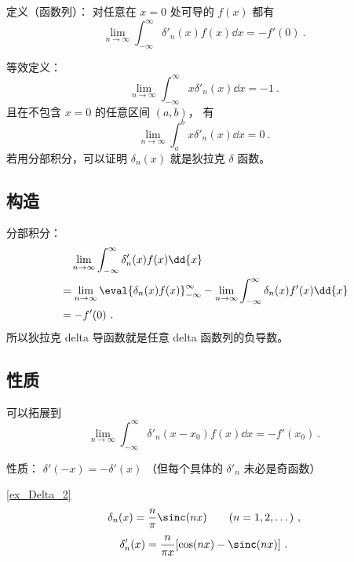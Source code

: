 
\begin{issues}
\issueDraft
\end{issues}


定义（函数列）： 对任意在 $x=0$ 处可导的 $f(x)$ 都有
\begin{equation}
\lim_{n\to\infty}\int_{-\infty}^\infty \delta'_n(x) f(x) \dd{x} = -f'(0)~.
\end{equation}

等效定义：
\begin{equation}
\lim_{n\to\infty}\int_{-\infty}^\infty x\delta'_n(x) \dd{x} = -1~.
\end{equation}
且在不包含 $x=0$ 的任意区间 $(a,b)$， 有
\begin{equation}
\lim_{n\to\infty}\int_a^b x\delta'_n(x) \dd{x} = 0~.
\end{equation}
若用分部积分，可以证明 $\delta_n(x)$ 就是狄拉克 $\delta$ 函数。

\subsection{构造}
分部积分：
\begin{equation}
\begin{aligned}
&\quad \lim_{n\to\infty}\int_{-\infty}^\infty \delta'_n(x) f(x) \dd{x}\\
&= \lim_{n\to\infty}\eval{\delta_n(x) f(x)}_{-\infty}^\infty - \lim_{n\to\infty}\int_{-\infty}^\infty \delta_n(x) f'(x) \dd{x}\\
&= - f'(0)~.
\end{aligned}
\end{equation}
所以狄拉克 delta 导函数就是任意 delta 函数列的负导数。


\subsection{性质}
可以拓展到
\begin{equation}
\lim_{n\to\infty}\int_{-\infty}^\infty \delta'_n(x-x_0) f(x) \dd{x} = -f'(x_0)~.
\end{equation}

性质： $\delta'(-x) = -\delta'(x)$ （但每个具体的 $\delta'_n$ 未必是奇函数）

\begin{example}{}
\autoref{ex_Delta_2}~
\begin{equation}
\delta_n(x) = \frac{n}{\pi}\sinc(n x) \qquad (n = 1, 2, \dots)~,
\end{equation}
\begin{equation}
\delta'_n(x) = \frac{n}{\pi x} [\cos(nx)-\sinc(nx)]~.
\end{equation}
\end{example}
